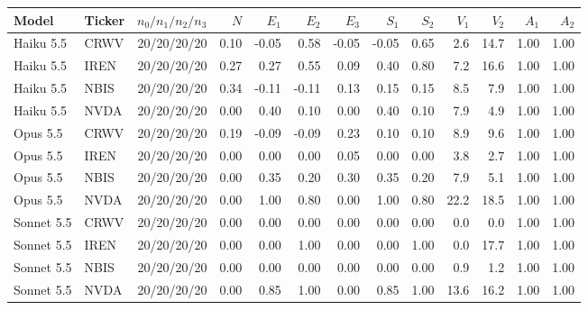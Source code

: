 \begin{tabular}{@{}llrrrrrrrrrrr@{}}
\toprule
Model & Ticker & $n_0/n_1/n_2/n_3$ & $N$ & $E_1$ & $E_2$ & $E_3$ & $S_1$ & $S_2$ & $V_1$ & $V_2$ & $A_1$ & $A_2$ \\
\midrule
Haiku 5.5 & CRWV & 20/20/20/20 & 0.10 & -0.05 & 0.58 & -0.05 & -0.05 & 0.65 & 2.6 & 14.7 & 1.00 & 1.00 \\
Haiku 5.5 & IREN & 20/20/20/20 & 0.27 & 0.27 & 0.55 & 0.09 & 0.40 & 0.80 & 7.2 & 16.6 & 1.00 & 1.00 \\
Haiku 5.5 & NBIS & 20/20/20/20 & 0.34 & -0.11 & -0.11 & 0.13 & 0.15 & 0.15 & 8.5 & 7.9 & 1.00 & 1.00 \\
Haiku 5.5 & NVDA & 20/20/20/20 & 0.00 & 0.40 & 0.10 & 0.00 & 0.40 & 0.10 & 7.9 & 4.9 & 1.00 & 1.00 \\
Opus 5.5 & CRWV & 20/20/20/20 & 0.19 & -0.09 & -0.09 & 0.23 & 0.10 & 0.10 & 8.9 & 9.6 & 1.00 & 1.00 \\
Opus 5.5 & IREN & 20/20/20/20 & 0.00 & 0.00 & 0.00 & 0.05 & 0.00 & 0.00 & 3.8 & 2.7 & 1.00 & 1.00 \\
Opus 5.5 & NBIS & 20/20/20/20 & 0.00 & 0.35 & 0.20 & 0.30 & 0.35 & 0.20 & 7.9 & 5.1 & 1.00 & 1.00 \\
Opus 5.5 & NVDA & 20/20/20/20 & 0.00 & 1.00 & 0.80 & 0.00 & 1.00 & 0.80 & 22.2 & 18.5 & 1.00 & 1.00 \\
Sonnet 5.5 & CRWV & 20/20/20/20 & 0.00 & 0.00 & 0.00 & 0.00 & 0.00 & 0.00 & 0.0 & 0.0 & 1.00 & 1.00 \\
Sonnet 5.5 & IREN & 20/20/20/20 & 0.00 & 0.00 & 1.00 & 0.00 & 0.00 & 1.00 & 0.0 & 17.7 & 1.00 & 1.00 \\
Sonnet 5.5 & NBIS & 20/20/20/20 & 0.00 & 0.00 & 0.00 & 0.00 & 0.00 & 0.00 & 0.9 & 1.2 & 1.00 & 1.00 \\
Sonnet 5.5 & NVDA & 20/20/20/20 & 0.00 & 0.85 & 1.00 & 0.00 & 0.85 & 1.00 & 13.6 & 16.2 & 1.00 & 1.00 \\
\bottomrule
\end{tabular}

